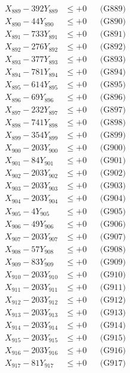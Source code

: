 \documentclass[a4paper,10pt]{article}
\begin{document}
{\begin{align}
X_{889} - 392Y_{889} &\leq +0 && \text{(G889)} \\
X_{890} - 44Y_{890} &\leq +0 && \text{(G890)} \\
\allowbreak
X_{891} - 733Y_{891} &\leq +0 && \text{(G891)} \\
X_{892} - 276Y_{892} &\leq +0 && \text{(G892)} \\
X_{893} - 377Y_{893} &\leq +0 && \text{(G893)} \\
X_{894} - 781Y_{894} &\leq +0 && \text{(G894)} \\
X_{895} - 614Y_{895} &\leq +0 && \text{(G895)} \\
X_{896} - 69Y_{896} &\leq +0 && \text{(G896)} \\
X_{897} - 232Y_{897} &\leq +0 && \text{(G897)} \\
X_{898} - 741Y_{898} &\leq +0 && \text{(G898)} \\
X_{899} - 354Y_{899} &\leq +0 && \text{(G899)} \\
X_{900} - 203Y_{900} &\leq +0 && \text{(G900)} \\
\allowbreak
X_{901} - 84Y_{901} &\leq +0 && \text{(G901)} \\
X_{902} - 203Y_{902} &\leq +0 && \text{(G902)} \\
X_{903} - 203Y_{903} &\leq +0 && \text{(G903)} \\
X_{904} - 203Y_{904} &\leq +0 && \text{(G904)} \\
X_{905} - 4Y_{905} &\leq +0 && \text{(G905)} \\
X_{906} - 49Y_{906} &\leq +0 && \text{(G906)} \\
X_{907} - 203Y_{907} &\leq +0 && \text{(G907)} \\
X_{908} - 57Y_{908} &\leq +0 && \text{(G908)} \\
X_{909} - 83Y_{909} &\leq +0 && \text{(G909)} \\
X_{910} - 203Y_{910} &\leq +0 && \text{(G910)} \\
\allowbreak
X_{911} - 203Y_{911} &\leq +0 && \text{(G911)} \\
X_{912} - 203Y_{912} &\leq +0 && \text{(G912)} \\
X_{913} - 203Y_{913} &\leq +0 && \text{(G913)} \\
X_{914} - 203Y_{914} &\leq +0 && \text{(G914)} \\
X_{915} - 203Y_{915} &\leq +0 && \text{(G915)} \\
X_{916} - 203Y_{916} &\leq +0 && \text{(G916)} \\
X_{917} - 81Y_{917} &\leq +0 && \text{(G917)} \\

\end{align}}
\end{document}
